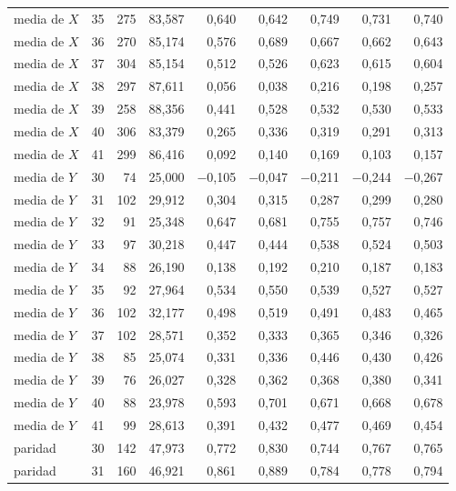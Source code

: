 \begin{table}[htbp]
{\begin{tabular}{@{}lrrrrrrrr@{}}
        media de $X$ & 35 & 275 & 83,587 & 0,640 & 0,642 & 0,749 & 0,731 & 0,740 \\
        media de $X$ & 36 & 270 & 85,174 & 0,576 & 0,689 & 0,667 & 0,662 & 0,643 \\
        media de $X$ & 37 & 304 & 85,154 & 0,512 & 0,526 & 0,623 & 0,615 & 0,604 \\
        media de $X$ & 38 & 297 & 87,611 & 0,056 & 0,038 & 0,216 & 0,198 & 0,257 \\
        media de $X$ & 39 & 258 & 88,356 & 0,441 & 0,528 & 0,532 & 0,530 & 0,533 \\
        media de $X$ & 40 & 306 & 83,379 & 0,265 & 0,336 & 0,319 & 0,291 & 0,313 \\
        media de $X$ & 41 & 299 & 86,416 & 0,092 & 0,140 & 0,169 & 0,103 & 0,157 \\
        media de $Y$ & 30 & 74 & 25,000 & $-$0,105 & $-$0,047 & $-$0,211 & $-$0,244 & $-$0,267 \\
        media de $Y$ & 31 & 102 & 29,912 & 0,304 & 0,315 & 0,287 & 0,299 & 0,280 \\
        media de $Y$ & 32 & 91 & 25,348 & 0,647 & 0,681 & 0,755 & 0,757 & 0,746 \\
        media de $Y$ & 33 & 97 & 30,218 & 0,447 & 0,444 & 0,538 & 0,524 & 0,503 \\
        media de $Y$ & 34 & 88 & 26,190 & 0,138 & 0,192 & 0,210 & 0,187 & 0,183 \\
        media de $Y$ & 35 & 92 & 27,964 & 0,534 & 0,550 & 0,539 & 0,527 & 0,527 \\
        media de $Y$ & 36 & 102 & 32,177 & 0,498 & 0,519 & 0,491 & 0,483 & 0,465 \\
        media de $Y$ & 37 & 102 & 28,571 & 0,352 & 0,333 & 0,365 & 0,346 & 0,326 \\
        media de $Y$ & 38 & 85 & 25,074 & 0,331 & 0,336 & 0,446 & 0,430 & 0,426 \\
        media de $Y$ & 39 & 76 & 26,027 & 0,328 & 0,362 & 0,368 & 0,380 & 0,341 \\
        media de $Y$ & 40 & 88 & 23,978 & 0,593 & 0,701 & 0,671 & 0,668 & 0,678 \\
        media de $Y$ & 41 & 99 & 28,613 & 0,391 & 0,432 & 0,477 & 0,469 & 0,454 \\
        paridad & 30 & 142 & 47,973 & 0,772 & 0,830 & 0,744 & 0,767 & 0,765 \\
        paridad & 31 & 160 & 46,921 & 0,861 & 0,889 & 0,784 & 0,778 & 0,794 \\

\end{tabular}}
\end{table}
